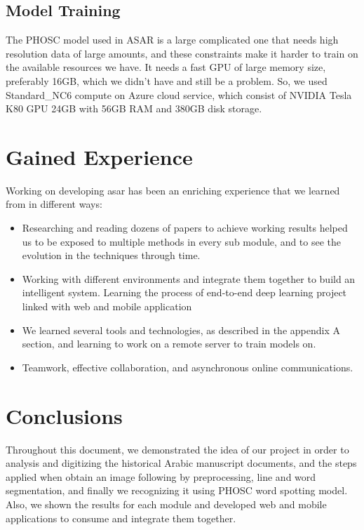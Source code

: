 \subsection{Model Training}
The PHOSC model used in ASAR is a large complicated one that needs high resolution data of large amounts, and these constraints make it harder to train on the available resources we have. It needs a fast GPU of large memory size, preferably 16GB, which we didn't have and still be a problem. So, we used Standard\_NC6 compute on Azure cloud service, which consist of NVIDIA Tesla K80 GPU 24GB with 56GB RAM and 380GB disk storage.

\section{Gained Experience}

Working on developing \acrshort{asar} has been an enriching experience that we learned from in different ways:
\begin{itemize}[itemsep=1pt, topsep=5pt]
    \item Researching and reading dozens of papers to achieve working results helped us to be exposed to multiple methods in every sub module, and to see the evolution in the techniques through time.
    \item Working with different environments and integrate them together to build an intelligent system. Learning the process of end-to-end deep learning project linked with web and mobile application 
    \item We learned several tools and technologies, as described in the appendix A section, and learning to work on a remote server to train models on.
    \item Teamwork, effective collaboration, and asynchronous online communications.
\end{itemize}

\section{Conclusions}
Throughout this document, we demonstrated the idea of our project in order to analysis and digitizing the historical Arabic manuscript documents, and the steps applied when obtain an image following by preprocessing, line and word segmentation, and finally we recognizing it using PHOSC word spotting model. Also, we shown the results for each module and developed web and mobile applications to consume and integrate them together. 

